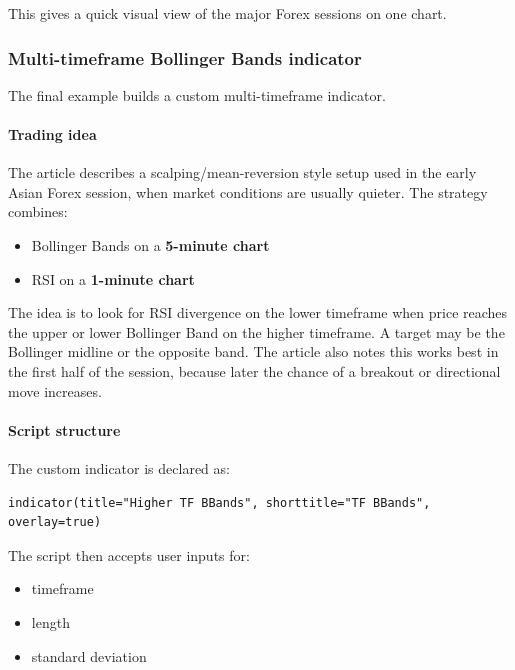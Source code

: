 \documentclass[12pt,openany]{book}
\begin{document}
This gives a quick visual view of the major Forex sessions on one chart.

\subsubsection{Multi-timeframe Bollinger Bands indicator}

The final example builds a custom multi-timeframe indicator.

\paragraph{Trading idea}

The article describes a scalping/mean-reversion style setup used in the early Asian Forex session, when market conditions are usually quieter. The strategy combines:

\begin{itemize}[leftmargin=*]
    \item Bollinger Bands on a \textbf{5-minute chart}
    \item RSI on a \textbf{1-minute chart}
\end{itemize}

The idea is to look for RSI divergence on the lower timeframe when price reaches the upper or lower Bollinger Band on the higher timeframe. A target may be the Bollinger midline or the opposite band. The article also notes this works best in the first half of the session, because later the chance of a breakout or directional move increases.

\paragraph{Script structure}

The custom indicator is declared as:

\begin{Verbatim}[breaklines=true,breakanywhere=true,fontsize=\small]
indicator(title="Higher TF BBands", shorttitle="TF BBands", overlay=true)
\end{Verbatim}

The script then accepts user inputs for:

\begin{itemize}[leftmargin=*]
    \item timeframe
    \item length
    \item standard deviation
\end{itemize}
\end{document}
